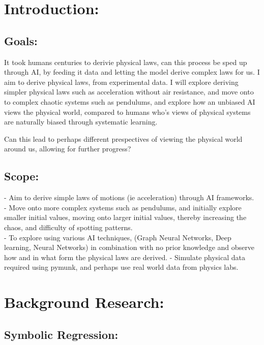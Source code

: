 \documentclass{article}
\begin{document}
\section{Introduction: }

\subsection{Goals: }

It took humans centuries to derivie physical laws, can this process be sped up through AI, by feeding it data and letting the model derive complex laws for us. I aim to derive physical laws, from experimental data. I will explore deriving simpler physical laws such as acceleration without air resistance, and move onto to complex chaotic systems such as pendulums, and explore how an unbiased AI views the physical world, compared to humans who's views of physical systems are naturally biased through systematic learning. 

Can this lead to perhaps different prespectives of viewing the physical world around us, allowing for further progress? 


\subsection{Scope: }


 - Aim to derive simple laws of motions (ie acceleration) through AI frameworks.\\ 

- Move onto more complex systems such as pendulums, and initially explore smaller initial values, moving onto larger initial values, 
thereby increasing the chaos, and difficulty of spotting patterns. \\

- To explore using various AI techniques, (Graph Neural Networks, Deep learning, Neural Networks) in combination with no prior knowledge and observe how and in what form the physical laws are derived.  
- Simulate physical data required using pymunk, and perhaps use real world data from physics labs.\\ 

\section{Background Research: }

\subsection{Symbolic Regression: }
\end{document}
